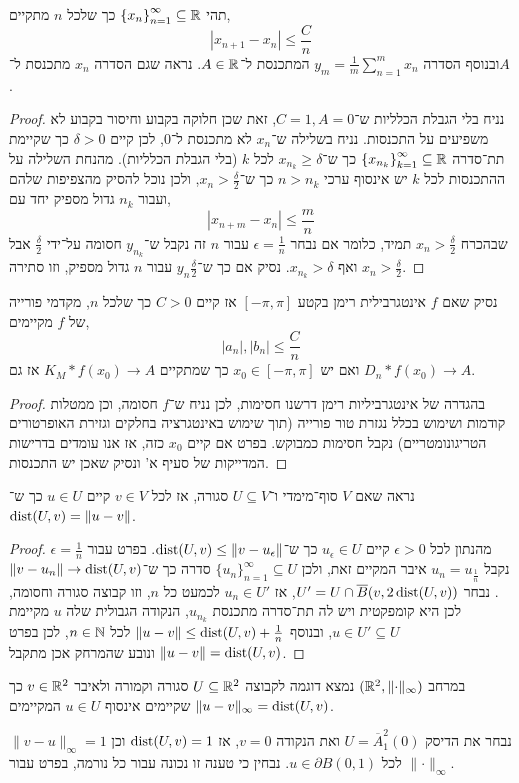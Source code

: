 \question{}
\subquestion{}
תהי ${\{ x_n \}}_{n = 1}^\infty \subseteq \mathbb{R}$ כך שלכל $n$ מתקיים,
\[
	|x_{n + 1} - x_n| \le \frac{C}{n}
\]
ובנוסף הסדרה $y_m = \frac{1}{m} \sum_{n = 1}^m x_n$ המתכנסת ל־$A \in \mathbb{R}$.
נראה שגם הסדרה $x_n$ מתכנסת ל־$A$.
\begin{proof}
	נניח בלי הגבלת הכלליות ש־$C = 1, A = 0$, זאת שכן חלוקה בקבוע וחיסור בקבוע לא משפיעים על התכנסות.
	נניח בשלילה ש־$x_n$ לא מתכנסת ל־$0$, לכן קיים $\delta > 0$ כך שקיימת תת־סדרה ${\{ x_{n_k} \}}_{k = 1}^\infty \subseteq \mathbb{R}$ כך ש־$x_{n_k} \ge \delta$ לכל $k$ (בלי הגבלת הכלליות).
	מהנחת השלילה על ההתכנסות לכל $k$ יש אינסוף ערכי $n > n_k$ כך ש־$x_n > \frac{\delta}{2}$, ולכן נוכל להסיק מהצפיפות שלהם ועבור $n_k$ גדול מספיק יחד עם,
	\[
		|x_{n + m} - x_n| \le \frac{m}{n}
	\]
	שבהכרח $x_n > \frac{\delta}{2}$ תמיד, כלומר אם נבחר $\epsilon = \frac{1}{n}$ עבור $n$ זה נקבל ש־$y_{n_k}$ חסומה על־ידי $\frac{\delta}{2}$ אבל $x_n > \frac{\delta}{2}$ ואף $x_{n_k} > \delta$.
	נסיק אם כך ש־$y_n \frac{\delta}{2}$ עבור $n$ גדול מספיק, וזו סתירה.
\end{proof}

\subquestion{}
נסיק שאם $f$ אינטגרבילית רימן בקטע $[-\pi, \pi]$ אז קיים $C > 0$ כך שלכל $n$,
מקדמי פורייה של $f$ מקיימים,
\[
	|a_n|, |b_n|
	\le \frac{C}{n}
\]
ואם יש $x_0 \in [-\pi, \pi]$ כך שמתקיים $K_M * f(x_0) \to A$ אז גם $D_n * f(x_0) \to A$.
\begin{proof}
	בהגדרה של אינטגרביליות רימן דרשנו חסימות, לכן נניח ש־$f$ חסומה, וכן ממטלות קודמות ושימוש בכלל נגזרת טור פורייה (תוך שימוש באינטגרציה בחלקים וגזירת האופרטורים הטריגונומטריים) נקבל חסימות כמבוקש.
	בפרט אם קיים $x_0$ כזה, אז אנו עומדים בדרישות המדייקות של סעיף א' ונסיק שאכן יש התכנסות.
\end{proof}

\question{}
\subquestion{}
נראה שאם $V$ סוף־מימדי ו־$U \subseteq V$ סגורה,
אז לכל $v \in V$ קיים $u \in U$ כך ש־$\operatorname{dist}(U, v) = \lVert u - v \rVert$.
\begin{proof}
	מהנתון לכל $\epsilon > 0$ קיים $u_{\epsilon} \in U$ כך ש־$\operatorname{dist}(U, v) \le \lVert v - u_{\epsilon} \rVert$.
	בפרט עבור $\epsilon = \frac{1}{n}$ נקבל $u_n = u_{\frac{1}{n}}$ איבר המקיים זאת, ולכן ${\{ u_n \}}_{n = 1}^\infty \subseteq U$ סדרה כך ש־$\lVert v - u_n \rVert \to \operatorname{dist}(U, v)$.
	נבחר $U' = U \cap \overline{B}(v, 2 \operatorname{dist}(U, v))$, אז $u_n \in U'$ לכמעט כל $n$, וזו קבוצה סגורה וחסומה, לכן היא קומפקטית ויש לה תת־סדרה מתכנסת $u_{n_k}$, הנקודה הגבולית שלה $u$ מקיימת $u \in U' \subseteq U$,
	ובנוסף $\lVert u - v \rVert \le \operatorname{dist}(U, v) + \frac{1}{n}$ לכל $n \in \mathbb{N}$, לכן בפרט $\lVert u - v \rVert = \operatorname{dist}(U, v)$ ונובע שהמרחק אכן מתקבל.
\end{proof}

\subquestion{}
במרחב $(\mathbb{R}^2, \lVert \cdot \rVert_\infty)$ נמצא דוגמה לקבוצה $U \subseteq \mathbb{R}^2$ סגורה וקמורה ולאיבר $v \in \mathbb{R}^2$ כך שקיימים אינסוף $u \in U$ המקיימים $\lVert u - v \rVert_\infty = \operatorname{dist}(U, v)$.
\begin{solution}
	נבחר את הדיסק $U = \overline{A}_1^2(0)$ ואת הנקודה $v = 0$, אז $\operatorname{dist}(U, v) = 1$ וכן $\lVert v - u \rVert_\infty = 1$ לכל $u \in \partial B(0, 1)$.
	נבחין כי טענה זו נכונה עבור כל נורמה, בפרט עבור $\lVert \cdot \rVert_\infty$.
\end{solution}


